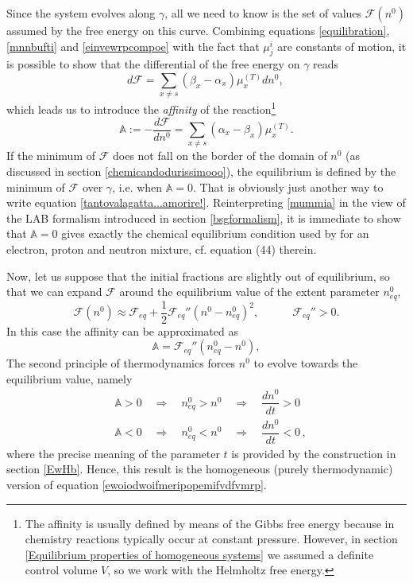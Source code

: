 \documentclass[usenatbib]{mnras}
\newcommand{\spc}{\quad \quad \quad}
\begin{document}
Since the system evolves along $\gamma$, all we need to know is the set of values $\mathcal{F}(n^0)$ assumed by the free energy on this curve. Combining equations \eqref{equilibration}, \eqref{mnnbufti} and \eqref{einvewrpcompoe}  with the fact that $\mu_j^i$ are constants of motion, it is possible to show that the differential of the free energy  on $\gamma$ reads
%
\begin{equation}
d\mathcal{F} = \sum_{x \neq s} (\beta_x - \alpha_x)\mu_x^{(T)} d n^0 , \, 
\end{equation}
%
which leads us to introduce the \textit{affinity} of the reaction\footnote{
The affinity is usually defined by means of the Gibbs free energy because in chemistry reactions typically occur at constant pressure. However, in section \ref{Equilibrium properties of homogeneous systems} we assumed a definite control volume $V$, so we work with the Helmholtz free energy.
}
%
\begin{equation}\label{mummia}
\mathbb{A} :=-\dfrac{d \mathcal{F}}{d n^0} = \sum_{x \neq s} (\alpha_x - \beta_x )\mu_x^{(T)}.
\end{equation}
%
If the minimum of $\mathcal{F}$ does not fall on the border of the domain of $n^0$ (as discussed in section \ref{chemicandodurissimooo}), the equilibrium is defined by the minimum of $\mathcal{F}$ over $\gamma$, i.e. when
$\mathbb{A}=0$. That is obviously just another way to write equation \eqref{tantovalagatta...amorire!}. 
Reinterpreting \eqref{mummia} in the view of the LAB formalism introduced in section \ref{bsgformalism}, it is immediate to show that $\mathbb{A}=0$ gives exactly the chemical equilibrium condition used by \cite{Gusakov2007} for an electron, proton and neutron mixture, cf. equation (44) therein. 
 
Now, let us suppose that the initial fractions are slightly out of equilibrium, so that we can expand $\mathcal{F}$ around  the equilibrium value of the extent parameter  $n^0_{eq}$,
% 
\begin{equation}
\mathcal{F}(n^0) \approx \mathcal{F}_{eq} + \dfrac{1}{2} \mathcal{F}_{eq}'' (n^0 - n_{eq}^0)^2, \spc \mathcal{F}_{eq}'' > 0.
\end{equation}
%
In this case the affinity can be approximated as
%
\begin{equation}\label{affinity}
\mathbb{A} = \mathcal{F}_{eq}'' (n_{eq}^0 - n^0),
\end{equation}
%
The second principle of thermodynamics forces $n^0$ to evolve towards the equilibrium value, namely
%
\begin{equation}\label{lechateliers}
\begin{split}
& \mathbb{A}>0 \quad \Longrightarrow \quad n_{eq}^0 > n^0 \quad \Longrightarrow \quad \dfrac{dn^0}{dt} >0 
\\
& \mathbb{A}<0 \quad \Longrightarrow \quad n_{eq}^0 < n^0 \quad \Longrightarrow \quad \dfrac{dn^0}{dt} <0 \, , 
\end{split}
\end{equation}
%
where the precise meaning of the parameter $t$ is provided by the construction in section \eqref{EwHb}. 
Hence, this result is the homogeneous (purely thermodynamic) version of equation \eqref{ewoiodwoifmeripopemifvdfvmrp}.
\end{document}
